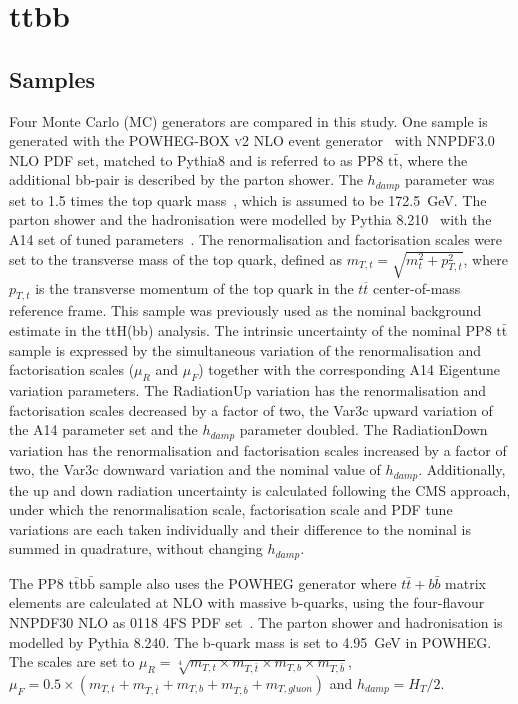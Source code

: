 \section{ttbb}
\label{sec:ttbb}

\subsection{Samples}
Four Monte Carlo (MC) generators are compared in this study. %
One sample is generated with the \textsc{POWHEG-BOX v2} NLO event generator~\cite{Nason:2004rx,Frixione:2007vw,Alioli:2010xd,Campbell:2014kua} with NNPDF3.0 NLO PDF set, matched to Pythia8 and is referred to as PP8 $\mathrm{t\bar{t}}$, where the additional bb-pair is described by the parton shower. The $h_{damp}$ parameter was set to 1.5 times the top quark mass~\cite{ATL-PHYS-PUB-2016-020}, which is assumed to be 172.5~GeV. The parton shower and the hadronisation were modelled by Pythia 8.210~\cite{PhysRevD.78.014026} with the A14 set of tuned parameters~\cite{ATL-PHYS-PUB-2014-021}. The renormalisation and factorisation scales were set to the transverse mass of the top quark, defined as $m_{T,t} = \sqrt{m^2_t + p^2_{T,t}}$, where $p_{T,t}$ is the transverse momentum of the top quark in the $t\overline{t}$ center-of-mass reference frame. This sample was previously used as the nominal background estimate in the ttH(bb) analysis.
The intrinsic uncertainty of the nominal PP8 $\mathrm{t\bar{t}}$ sample is expressed by the simultaneous variation of the renormalisation and factorisation scales ($\mu_R$ and $\mu_F$) together with the corresponding A14 Eigentune variation parameters. The RadiationUp variation has the renormalisation and factorisation scales decreased by a factor of two, the Var3c upward variation of the A14 parameter set and the $h_{damp}$ parameter doubled. The RadiationDown variation has the renormalisation and factorisation scales increased by a factor of two, the Var3c downward variation and the nominal value of $h_{damp}$.
Additionally, the up and down radiation uncertainty is calculated following the CMS approach, under which the renormalisation scale, factorisation scale and PDF tune variations are each taken individually and their difference to the nominal is summed in quadrature, without changing $h_{damp}$.

The PP8 $\mathrm{t\bar{t}b\bar{b}}$ sample also uses the \textsc{POWHEG} generator where $t\bar{t}+b\bar{b}$ matrix elements are calculated at NLO with massive b-quarks, using the four-flavour NNPDF30 NLO as 0118 4FS PDF set~\cite{Jezo:2018yaf}. The parton shower and hadronisation is modelled by Pythia 8.240. The b-quark mass is set to 4.95~GeV in \textsc{POWHEG}. The scales are set to $\mu_R=\sqrt[4]{m_{T,t}\times m_{T,\bar{t}}\times m_{T,b}\times m_{T,\bar{b}} }$, $\mu_F=0.5\times(m_{T,t}+m_{T,\bar{t}}+m_{T,b}+ m_{T,\bar{b}}+m_{T,gluon})$ and $h_{damp}=H_T/2$.

